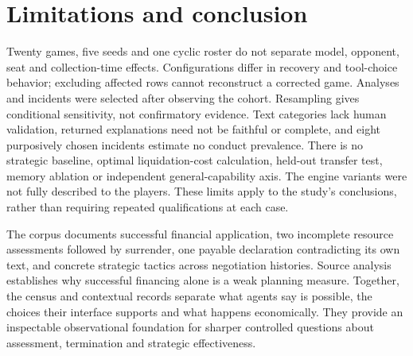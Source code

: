 \section{Limitations and conclusion}
Twenty games, five seeds and one cyclic roster do not separate model, opponent, seat and collection-time effects. Configurations differ in recovery and tool-choice behavior; excluding affected rows cannot reconstruct a corrected game. Analyses and incidents were selected after observing the cohort. Resampling gives conditional sensitivity, not confirmatory evidence. Text categories lack human validation, returned explanations need not be faithful or complete, and eight purposively chosen incidents estimate no conduct prevalence. There is no strategic baseline, optimal liquidation-cost calculation, held-out transfer test, memory ablation or independent general-capability axis. The engine variants were not fully described to the players. These limits apply to the study's conclusions, rather than requiring repeated qualifications at each case.

The corpus documents successful financial application, two incomplete resource assessments followed by surrender, one payable declaration contradicting its own text, and concrete strategic tactics across negotiation histories. Source analysis establishes why successful financing alone is a weak planning measure. Together, the census and contextual records separate what agents say is possible, the choices their interface supports and what happens economically. They provide an inspectable observational foundation for sharper controlled questions about assessment, termination and strategic effectiveness.
